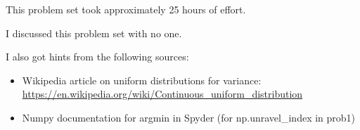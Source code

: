 \documentclass{article}
\begin{document}
This problem set took approximately 25 hours of effort.

I discussed this problem set with no one.

I also got hints from the following sources:
\begin{itemize}
\item Wikipedia article on uniform distributions for variance: \url{https://en.wikipedia.org/wiki/Continuous_uniform_distribution}
\item Numpy documentation for argmin in Spyder (for np.unravel\_index in prob1)
\end{itemize}
\end{document}
